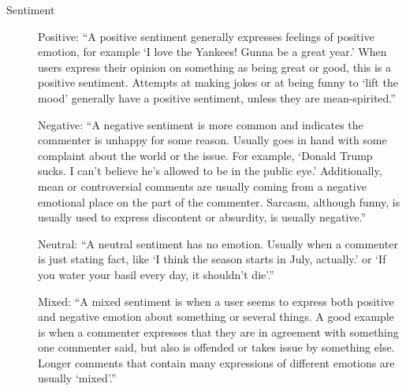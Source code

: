\begin{description}
	\item [Sentiment]
		Positive: ``A positive sentiment generally expresses feelings of positive emotion, for example `I love the Yankees! Gunna be a great year.' When users express their opinion on something as being great or good, this is a positive sentiment. Attempts at making jokes or at being funny to `lift the mood' generally have a positive sentiment, unless they are mean-spirited.''
		
		Negative: ``A negative sentiment is more common and indicates the commenter is unhappy for some reason. Usually goes in hand with some complaint about the world or the issue. For example, `Donald Trump sucks. I can't believe he's allowed to be in the public eye.' Additionally, mean or controversial comments are usually coming from a negative emotional place on the part of the commenter. Sarcasm, although funny, is usually used to express discontent or absurdity, is usually negative.''
		
		Neutral: ``A neutral sentiment has no emotion. Usually when a commenter is just stating fact, like `I think the season starts in July, actually.' or `If you water your basil every day, it shouldn't die'.''
		
		Mixed: ``A mixed sentiment is when a user seems to express both positive and negative emotion about something or several things. A good example is when a commenter expresses that they are in agreement with something one commenter said, but also is offended or takes issue by something else. Longer comments that contain many expressions of different emotions are usually `mixed'.''
\end{description}


